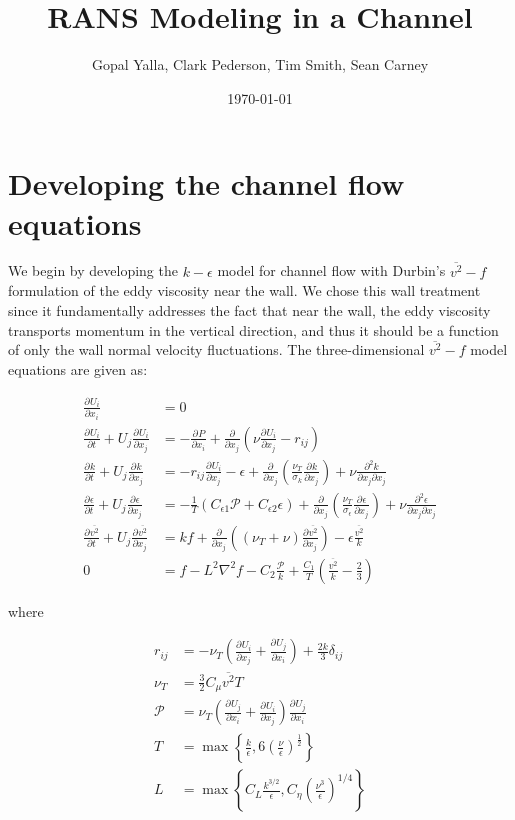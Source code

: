\documentclass[a4paper,11pt]{article}
\title{\vspace{-4ex}RANS Modeling in a Channel}
\author{Gopal Yalla, Clark Pederson, Tim Smith, Sean Carney}
\date{\today}
\newcommand{\pderiv}[3][]{%
  \ensuremath{\frac{\partial^{#1} {#2}}{\partial {#3}^{#1}}}}
\newcommand{\noi}{\noindent}
\newcommand{\ep}{\epsilon}
\begin{document}
\maketitle
\section{Developing the channel flow equations}

We begin by developing the $k-\epsilon$ model for channel flow with Durbin's
$\overline{v^2}-f$ formulation of the eddy viscosity near
the wall. We chose this wall treatment since it fundamentally addresses the fact that near
the wall, the eddy viscosity transports momentum in the vertical direction, and
thus it should be a function of only the wall normal velocity fluctuations. The
three-dimensional $\overline{v^2}-f$ model equations are given as:

\begin{align}
\pderiv{U_i}{x_i} &= 0 \label{eq:continuity} \\
\pderiv{U_i}{t} + U_j\pderiv{U_i}{x_j} &= -\pderiv{P}{x_i} +
\pderiv{}{x_j}\left(\nu\pderiv{U_i}{x_j} - r_{ij}\right) \\
\pderiv{k}{t} + U_j\pderiv{k}{x_j} &= -r_{ij}\pderiv{U_i}{x_j} - \epsilon +
\pderiv{}{x_j}\left(\frac{\nu_T}{\sigma_k}\pderiv{k}{x_j}\right) +
\nu\frac{\partial^2 k}{\partial x_j \partial x_j} \\
\pderiv{\epsilon}{t} + U_j\pderiv{\epsilon}{x_j} &=
-\frac{1}{T}\left(C_{\epsilon 1} \mathcal{P} + C_{\epsilon 2} \epsilon\right) +
\pderiv{}{x_j}\left(\frac{\nu_T}{\sigma_\epsilon}\pderiv{\epsilon}{x_j}\right) +
\nu\frac{\partial^2 \epsilon}{\partial x_j \partial x_j} \\
\pderiv{\overline{v^2}}{t} + U_j\pderiv{\overline{v^2}}{x_j} &= kf +
\pderiv{}{x_j}\left((\nu_T+\nu)\pderiv{\overline{v^2}}{x_j}\right) - \epsilon
\frac{\overline{v^2}}{k} \\
0 &=  f -  L^2 \nabla^2 f  -C_2 \frac{\mathcal{P}}{k} + \frac{C_1}{T} \left(
\frac{\overline{v^2}}{k} - \frac{2}{3} \right) 
\label{eq:redistribution}
\end{align}

\noi where 

\begin{align*}
r_{ij} &= -\nu_T\left(\pderiv{U_i}{x_j} + \pderiv{U_j}{x_i}\right) +
\frac{2k}{3}\delta_{ij}\\
\nu_T &= \frac{3}{2}C_\mu \overline{v^2} T \\
\mathcal{P} &= \nu_T\left( \pderiv{U_j}{x_i} + \pderiv{U_i}{x_j}\right)\pderiv{U_j}{x_i} \\
T &= \max \left\{ \frac{k}{\ep} , 6 \left( \frac{\nu}{\ep} \right)^{\frac{1}{2}}
\right\} \\
L &= \max \left\{ C_L \frac{k^{3/2}}{\ep}, C_\eta \left( \frac{\nu^3}{\ep}
\right)^{1/4} \right\}
\end{align*}
\end{document}
